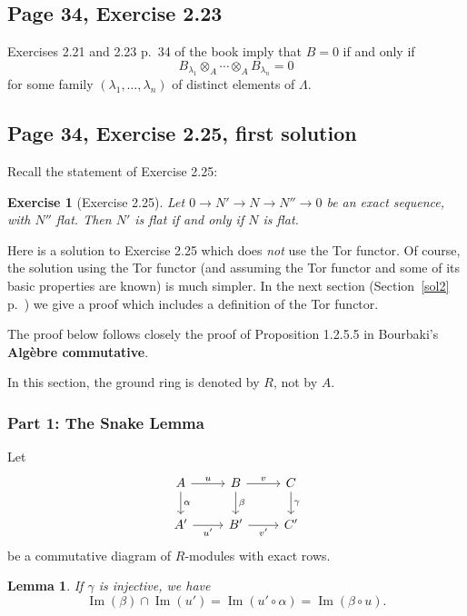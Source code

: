 \documentclass[parskip=half,fontsize=12pt]{scrartcl}%
\newcommand{\oo}{\operatorname}\newcommand{\ooo}{\operatorname*}
\newtheorem{exo}[thm]{Exercise}
\newtheorem{lem}[thm]{Lemma}
\begin{document}
\subsection{Page 34, Exercise 2.23}\label{223}%

Exercises 2.21 and 2.23 p.~34 of the book imply that $B=0$ if and only if 
$$
B_{\lambda_1}\otimes_A\cdots\otimes_AB_{\lambda_n}=0
$$ 
for some family $(\lambda_1,\dots,\lambda_n)$ of distinct elements of $\Lambda$. 

\subsection{Page 34, Exercise 2.25, first solution}\label{s225a}%

Recall the statement of Exercise 2.25:

\begin{exo}[Exercise 2.25]\label{e225}
Let $0\to N'\to N\to N''\to0$ be an exact sequence, with $N''$ flat. Then $N'$ is flat if and only if $N$ is flat.
\end{exo}

Here is a solution to Exercise 2.25 which does \emph{not} use the Tor functor. Of course, the solution using the Tor functor (and assuming the Tor functor and some of its basic properties are known) is much simpler. In the next section (Section~\ref{sol2} p.~\pageref{sol2}) we give a proof which includes a definition of the Tor functor.

The proof below follows closely the proof of Proposition 1.2.5.5 in Bourbaki's \textbf{Algèbre commutative}.

In this section, the ground ring is denoted by $R$, not by $A$.

\subsubsection{Part 1: The Snake Lemma}\label{ssl}

Let 
\begin{equation}\label{b10}
\begin{tikzcd}
A\ar[d,"\alpha"]\ar[r,"u"]&B\ar[d,"\beta"]\ar[r,"v"]&C\ar[d,"\gamma"]\\ 
A'\ar[r,"u'"']&B'\ar[r,"v'"']&C'
\end{tikzcd}
\end{equation}
be a commutative diagram of $R$-modules with exact rows. 

\begin{lem}\label{b1i}
If $\gamma$ is injective, we have 
$$
\oo{Im}(\beta)\cap\oo{Im}(u')=\oo{Im}(u'\circ\alpha)=\oo{Im}(\beta\circ u).
$$
\end{lem}
\end{document}
